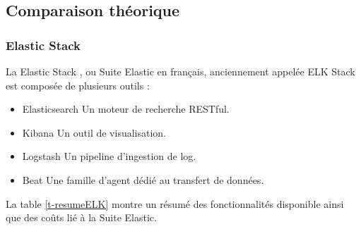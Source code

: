\documentclass[paper=a4, fontsize=11pt]{scrartcl}
\begin{document}
\subsection{Comparaison théorique}
\subsubsection{Elastic Stack}
La \og Elastic Stack \fg, ou \og Suite Elastic \fg en français, anciennement appelée \og ELK Stack \fg est composée de plusieurs outils :
\begin{itemize}
    \item Elasticsearch
    \subitem Un moteur de recherche RESTful.
    \item Kibana
    \subitem Un outil de visualisation.
    \item Logstash
    \subitem Un pipeline d'ingestion de log.
    \item Beat
    \subitem Une famille d'agent dédié au transfert de données.
\end{itemize}

La table \ref{t-resumeELK} montre un résumé des fonctionnalités disponible ainsi que des coûts lié à la Suite Elastic.
\end{document}
